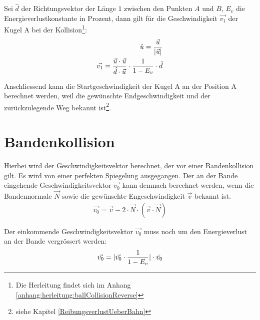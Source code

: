 Sei $\hat{d}$ der Richtungsvektor der Länge $1$ zwischen den Punkten $A$ und $B$, $E_v$ die Energieverlustkonstante in
Prozent, dann gilt für die Geschwindigkeit $\vec{v_1}$ der Kugel A bei der Kollision\footnote{Die Herleitung findet sich im Anhang \ref{anhang:herleitung:ballCollisionReverse}}:
\begin{align}
    \hat{u} = \frac{\vec{u}}{\lvert \vec{u} \rvert}\\
    \vec{v_1} = \frac{\vec{u} \cdot \vec{u}}{\hat{d} \cdot \vec{u}} \cdot \frac{1}{1 - E_v} \cdot \hat{d}
\end{align}

Anschliessend kann die Startgeschwindigkeit der Kugel A an der Position A berechnet werden, weil die gewünschte
Endgeschwindigkeit und der zurückzulegende Weg bekannt ist\footnote{siehe Kapitel \ref{ReibungsverlustUeberBahn}}.

\section{Bandenkollision}

Hierbei wird der Geschwindigkeitsvektor berechnet, der vor einer Bandenkollision gilt.
Es wird von einer perfekten Spiegelung ausgegangen. Der an der Bande eingehende
Geschwindigkeitsvektor $\vec{v_0}$ kann demnach berechnet werden, wenn die Bandennormale $\vec{N}$ sowie die
gewünschte Engeschwindigkeit $\vec{v}$ bekannt ist.
\begin{align}
    \vec{v_0} = \vec{v} - 2 \cdot \vec{N} \cdot (\vec{v} \cdot \vec{N})
\end{align}

Der einkommende Geschwindigkeitsvektor $\vec{v_0}$ muss noch um den Energieverlust an der Bande vergrössert werden:
\begin{align}
    \vec{v_0} = \lvert \vec{v_0} \cdot \frac{1}{1 - E_v} \rvert \cdot \hat{v_0}
\end{align}